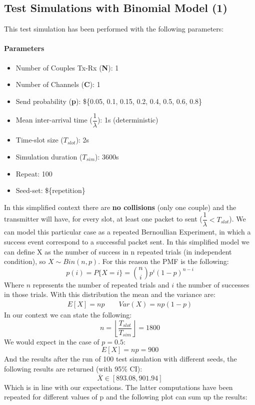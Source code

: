 \subsection{Test Simulations with Binomial Model (1)}
This test simulation has been performed with the following parameters:
\paragraph{Parameters}
\begin{itemize}
	\item Number of Couples Tx-Rx (\textbf{N}): 1
	\item Number of Channels (\textbf{C}): 1
	\item Send probability (\textbf{p}): \$\{0.05, 0.1, 0.15, 0.2, 0.4, 0.5, 0.6, 0.8\}
	\item Mean inter-arrival time ($\dfrac{1}{\lambda}$): 1s (deterministic)
	\item Time-slot size ($T_{slot}$): 2s 
	\item Simulation duration ($T_{sim}$): 3600s
	\item Repeat: 100
	\item Seed-set: \$\{repetition\}
\end{itemize}
In this simplified context there are \textbf{no collisions} (only one couple) and the transmitter will have, for every slot, at least one packet to sent ($\dfrac{1}{\lambda} < T_{slot}$). We can model this particular case as a repeated Bernoullian Experiment, in which a success event correspond to a successful packet sent. In this simplified model we can define X as the number of success in n repeated trials (in independent condition), so $X \sim Bin(n, p)$. For this reason the PMF is the following:
\begin{equation}
	p(i) = P\{X = i\} = \binom{n}{i} p^{i} (1-p)^{n-i}
\end{equation}
Where $n$ represents the number of repeated trials and $i$ the number of successes in those trials. With this distribution the mean and the variance are:
\begin{align*}
	E[X] = np \qquad     
	Var(X) = np(1-p)
\end{align*}
In our context we can state the following:
\begin{equation}
	n = \left \lfloor{\dfrac{T_{slot}}{T_{sim}}}\right \rfloor = 1800
\end{equation}
We would expect in the case of $p = 0.5$:
\begin{equation}
	E[X] = np = 900
\end{equation}
And the results after the run of 100 test simulation with different seeds, the following results are returned (with 95\% CI):
\begin{equation}
	\overline{X} \in [893.08, 901.94]
\end{equation}
Which is in line with our expectations. The latter computations have been repeated for different values of p and the following plot can sum up the results:

